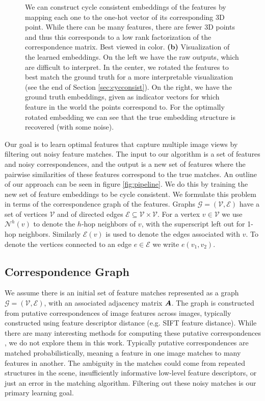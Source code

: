 \documentclass{article} %
\begin{document}
\begin{figure}[t]
{  We can construct cycle consistent embeddings of the features by mapping each one to the one-hot vector of its corresponding 3D point.
  While there can be many features, there are fewer 3D points and thus this corresponds to a low rank factorization of the correspondence matrix.
  Best viewed in color.
  \textbf{(b)} Visualization of the learned embeddings.
  On the left we have the raw outputs, which are difficult to interpret.
  In the center, we rotated the features to best match the ground truth for a more interpretable visualization (see the end of Section \ref{sec:cycconsist}).
  On the right, we have the ground truth embeddings, given as indicator vectors for which feature in the world the points correspond to.
  For the optimally rotated embedding we can see that the true embedding structure is recovered (with some noise).
}
\label{fig:1}
\end{figure}

Our goal is to learn optimal features that capture multiple image views by filtering out noisy feature matches.
The input to our algorithm is a set of features and noisy correspondences, and the output is a new set of features where the pairwise similarities of these features correspond to the true matches.
An outline of our approach can be seen in figure \ref{fig:pipeline}.
We do this by training the new set of feature embeddings to be cycle consistent.
We formulate this problem in terms of the correspondence graph of the features.
Graphs $\mathcal{G} = (\mathcal{V}, \mathcal{E})$ have a set of vertices $\mathcal{V}$ and of directed edges $\mathcal{E} \subseteq \mathcal{V} \times \mathcal{V}$.
For a vertex $v \in \mathcal{V}$ we use $\mathcal{N}^{h}(v)$ to denote the $h$-hop neighbors of $v$, with the superscript left out for 1-hop neighbors.
Similarly $\mathcal{E}(v)$ is used to denote the edges associated with $v$.
To denote the vertices connected to an edge $e \in \mathcal{E}$ we write $e(v_1, v_2)$.
\subsection{Correspondence Graph} \label{sec:corrgraph}
We assume there is an initial set of feature matches represented as a graph $\mathcal{G} = (\mathcal{V}, \mathcal{E})$, with an associated adjacency matrix ${\bm{A}}$.
The graph is constructed from putative correspondences of image features across images, typically constructed using feature descriptor distance (e.g. SIFT feature distance).
While there are many interesting methods for computing these putative correspondences \citep{suh2015subgraph, yi2018learning}, we do not explore them in this work.
Typically putative correspondences are matched probabilistically, meaning a feature in one image matches to many features in another.
The ambiguity in the matches could come from repeated structures in the scene, insufficiently informative low-level feature descriptors, or just an error in the matching algorithm.
Filtering out these noisy matches is our primary learning goal.
\end{document}
